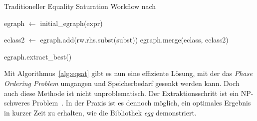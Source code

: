 \begin{algorithm}[H]
  \caption{Traditioneller Equality Saturation Workflow nach~\cite{2021-egg}}\label{alg:eqsat}
  \begin{algorithmic}
    \State egraph $\gets$ initial\_egraph(expr)
    
      
          \State  eclass2 $\gets$ egraph.add(rw.rhs.subst(subst))
          \State egraph.merge(eclass, eclass2)
        \EndFor 
      \EndFor
    \EndWhile

    \State \Return egraph.extract\_best()
    \EndFunction
  \end{algorithmic}
\end{algorithm}

Mit Algorithmus~\ref{alg:eqsat} gibt es nun eine effiziente Lösung, mit der das \textit{Phase Ordering Problem} umgangen und Speicherbedarf gesenkt werden kann.
Doch auch diese Methode ist nicht unproblematisch. Der Extraktionsschritt ist ein NP-schweres Problem~\cite{phaseorder-2009}. In der Praxis ist es dennoch möglich, ein optimales
Ergebnis in kurzer Zeit zu erhalten, wie die Bibliothek \textit{egg} demonstriert.  
